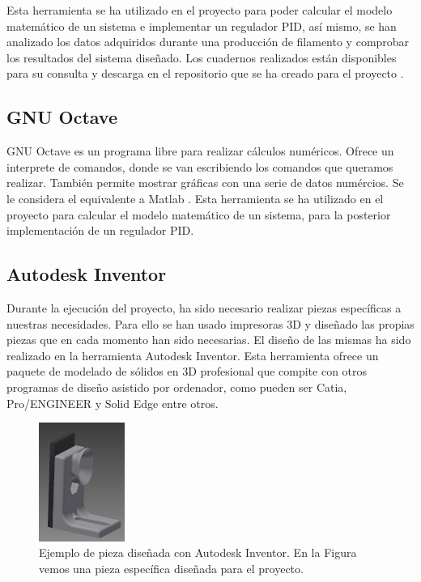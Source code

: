 Esta herramienta se ha utilizado en el proyecto para poder calcular el modelo matemático de un sistema e implementar un regulador PID, así mismo, se han analizado los datos adquiridos durante una producción de filamento y comprobar los resultados del sistema diseñado. Los cuadernos realizados están disponibles para su consulta y descarga en el repositorio que se ha creado para el proyecto \cite{githubTFG}.

\subsection{GNU Octave}
GNU Octave es un programa libre para realizar cálculos numéricos. Ofrece un interprete de comandos, donde se van escribiendo los comandos que queramos realizar. También permite mostrar gráficas con una serie de datos numércios. Se le considera el equivalente a Matlab \cite{octave}. Esta herramienta se ha utilizado en el proyecto para calcular el modelo matemático de un sistema, para la posterior implementación de un regulador PID.

\subsection{Autodesk Inventor}
Durante la ejecución del proyecto, ha sido necesario realizar piezas específicas a nuestras necesidades. Para ello se han usado impresoras 3D y diseñado las propias piezas que en cada momento han sido necesarias. El diseño de las mismas ha sido realizado en la herramienta Autodesk Inventor. Esta herramienta ofrece un paquete de modelado de sólidos en 3D profesional que compite con otros programas de diseño asistido por ordenador, como pueden ser Catia, Pro/ENGINEER y Solid Edge entre otros.

\begin{figure}[H]
    \centering
    \includegraphics[width=0.25\textwidth]{images/peletizadora/guia.png}
    \caption[Ejemplo de pieza diseñada con Autodesk Inventor.]{Ejemplo de pieza diseñada con Autodesk Inventor. En la Figura vemos una pieza específica diseñada para el proyecto.}
    \label{fig:pieza}
\end{figure}

